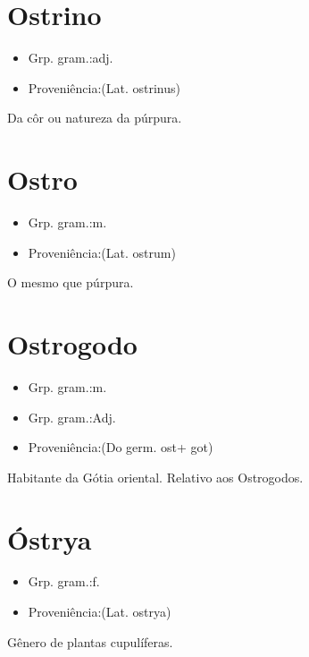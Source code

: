 \section{Ostrino}
\begin{itemize}
\item {Grp. gram.:adj.}
\end{itemize}
\begin{itemize}
\item {Proveniência:(Lat. \textunderscore ostrinus\textunderscore )}
\end{itemize}
Da côr ou natureza da púrpura.
\section{Ostro}
\begin{itemize}
\item {Grp. gram.:m.}
\end{itemize}
\begin{itemize}
\item {Proveniência:(Lat. \textunderscore ostrum\textunderscore )}
\end{itemize}
O mesmo que \textunderscore púrpura\textunderscore .
\section{Ostrogodo}
\begin{itemize}
\item {Grp. gram.:m.}
\end{itemize}
\begin{itemize}
\item {Grp. gram.:Adj.}
\end{itemize}
\begin{itemize}
\item {Proveniência:(Do germ. \textunderscore ost\textunderscore  + \textunderscore got\textunderscore )}
\end{itemize}
Habitante da Gótia oriental.
Relativo aos Ostrogodos.
\section{Óstrya}
\begin{itemize}
\item {Grp. gram.:f.}
\end{itemize}
\begin{itemize}
\item {Proveniência:(Lat. \textunderscore ostrya\textunderscore )}
\end{itemize}
Gênero de plantas cupulíferas.
